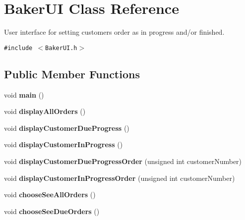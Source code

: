 \hypertarget{class_baker_u_i}{
\section{Baker\-UI Class Reference}
\label{class_baker_u_i}
}
User interface for setting customers order as in progress and/or finished.  


{\tt \#include $<$Baker\-UI.h$>$}

\subsection*{Public Member Functions}
\begin{CompactItemize}
\item 
\hypertarget{class_baker_u_i_ea83b916b3f52eec32ae6d54d59b4453}{
void {\bf main} ()}
\label{class_baker_u_i_ea83b916b3f52eec32ae6d54d59b4453}

\item 
\hypertarget{class_baker_u_i_d69822b9289cd53fa4da8f4f39864d19}{
void {\bf display\-All\-Orders} ()}
\label{class_baker_u_i_d69822b9289cd53fa4da8f4f39864d19}

\item 
\hypertarget{class_baker_u_i_00eeac47a993278134a2d8ba936f6f31}{
void {\bf display\-Customer\-Due\-Progress} ()}
\label{class_baker_u_i_00eeac47a993278134a2d8ba936f6f31}

\item 
\hypertarget{class_baker_u_i_49612691d8a1c466378d3e4507aff847}{
void {\bf display\-Customer\-In\-Progress} ()}
\label{class_baker_u_i_49612691d8a1c466378d3e4507aff847}

\item 
\hypertarget{class_baker_u_i_9afa245c6153335e553d88f8e7ad2c2e}{
void {\bf display\-Customer\-Due\-Progress\-Order} (unsigned int customer\-Number)}
\label{class_baker_u_i_9afa245c6153335e553d88f8e7ad2c2e}

\item 
\hypertarget{class_baker_u_i_12edcb5c93a8a60d06b8c9de906c4be0}{
void {\bf display\-Customer\-In\-Progress\-Order} (unsigned int customer\-Number)}
\label{class_baker_u_i_12edcb5c93a8a60d06b8c9de906c4be0}

\item 
\hypertarget{class_baker_u_i_d7bd9a6e8c49c52704a9ab4e7c5a1a4c}{
void {\bf choose\-See\-All\-Orders} ()}
\label{class_baker_u_i_d7bd9a6e8c49c52704a9ab4e7c5a1a4c}

\item 
\hypertarget{class_baker_u_i_eaed66fd617380be4adf093146dba169}{
void {\bf choose\-See\-Due\-Orders} ()}
\label{class_baker_u_i_eaed66fd617380be4adf093146dba169}


\end{CompactItemize}
